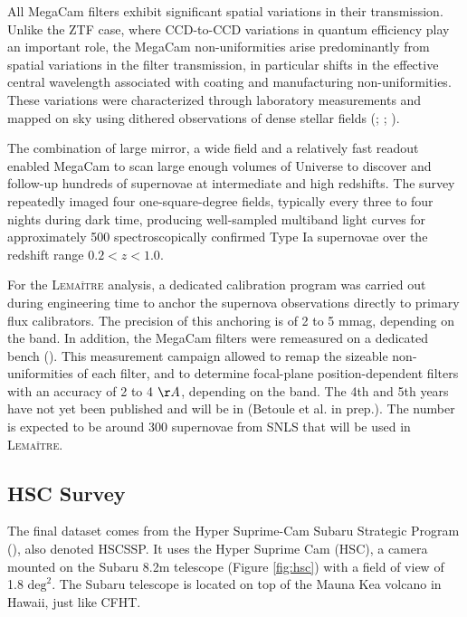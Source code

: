 All MegaCam filters exhibit significant spatial variations in their 
transmission. Unlike the ZTF case, where CCD-to-CCD variations in 
quantum efficiency play an important role, the MegaCam 
non-uniformities arise predominantly from spatial variations in the 
filter transmission, in particular shifts in the effective central 
wavelength associated with coating and manufacturing non-uniformities. 
These variations were characterized through laboratory measurements 
and mapped on sky using dithered observations of dense stellar fields 
(\cite{Regnault_2009}; \cite{Betoule_2013}; \cite{Sassolas_2018}). 

The combination of large mirror, a wide field and a relatively fast 
readout enabled MegaCam to scan large enough volumes of Universe to 
discover and follow-up hundreds of supernovae at intermediate and high 
redshifts. The survey repeatedly imaged four one-square-degree fields, 
typically every three to four nights during dark time, producing 
well-sampled multiband light curves for approximately 500 
spectroscopically confirmed Type Ia supernovae over the redshift range 
$0.2<z<1.0$. 

For the \textsc{Lemaître} analysis, a dedicated calibration program was carried out during engineering time to anchor the 
supernova observations directly to primary flux calibrators. The precision of this anchoring is 
of 2 to 5 mmag, depending on the band. In addition, the MegaCam filters 
were remeasured on a dedicated bench (\cite{Sassolas_2018}). This measurement campaign allowed to remap the sizeable non-uniformities of each 
filter, and to determine focal-plane position-dependent filters with an accuracy of 2 to 4 $\AA$, 
depending on the band. 
The 4th and 5th years have not yet been published and will be in (Betoule et al. in prep.). The number is expected to be around 300 supernovae from SNLS 
that will be used in \textsc{Lemaître}. 


\subsection{HSC Survey} \label{sec:hsc}


The final dataset comes from the Hyper Suprime-Cam Subaru Strategic Program (\cite{Aihara_2022}), also denoted HSCSSP. 
It uses the Hyper Suprime Cam (HSC), a camera mounted on the Subaru 8.2m telescope (Figure \ref{fig:hsc}) with a field of view of 1.8 $\text{deg}^2$. 
The Subaru telescope is located on top of the Mauna 
Kea volcano in Hawaii, just like CFHT. 



